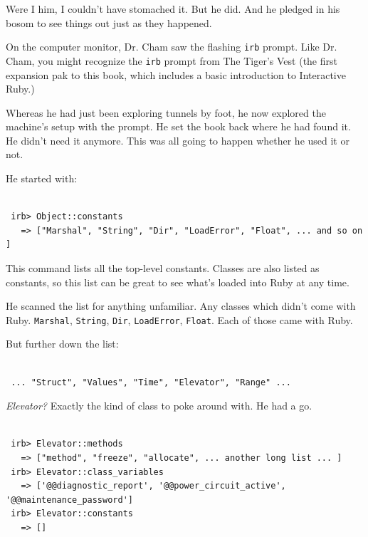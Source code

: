\documentclass[10pt,twoside]{report}
\begin{document}
Were I him, I couldn't have stomached it.  But he did.  And he pledged
in his bosom to see things out just as they happened.

On the computer monitor, Dr. Cham saw the flashing
\lstinline[breaklines=true]|irb| prompt.  Like Dr. Cham, you might
recognize the \lstinline[breaklines=true]|irb| prompt from The Tiger's
Vest (the first expansion pak to this book, which includes a basic
introduction to Interactive Ruby.)

Whereas he had just been exploring tunnels by foot, he now explored
the machine's setup with the prompt.  He set the book back where he
had found it.  He didn't need it anymore.  This was all going to
happen whether he used it or not.

He started with:


\begin{lstlisting}

 irb> Object::constants
   => ["Marshal", "String", "Dir", "LoadError", "Float", ... and so on ]

\end{lstlisting}


This command lists all the top-level constants.  Classes are also
listed as constants, so this list can be great to see what's loaded
into Ruby at any time.

He scanned the list for anything unfamiliar.  Any classes which didn't
come with Ruby. \lstinline[breaklines=true]|Marshal|,
\lstinline[breaklines=true]|String|, \lstinline[breaklines=true]|Dir|,
\lstinline[breaklines=true]|LoadError|,
\lstinline[breaklines=true]|Float|.  Each of those came with Ruby.

But further down the list:


\begin{lstlisting}

 ... "Struct", "Values", "Time", "Elevator", "Range" ...

\end{lstlisting}


{\em Elevator?}  Exactly the kind of class to poke around with.  He
had a go.


\begin{lstlisting}

 irb> Elevator::methods
   => ["method", "freeze", "allocate", ... another long list ... ]
 irb> Elevator::class_variables
   => ['@@diagnostic_report', '@@power_circuit_active', '@@maintenance_password']
 irb> Elevator::constants
   => []

\end{lstlisting}
\end{document}
